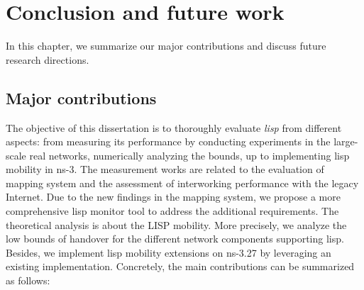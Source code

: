 
\chapter{Conclusion and future work}
\label{cha:conclusion}
In this chapter, we summarize our major contributions and discuss future research directions.

\section{Major contributions}
The objective of this dissertation is to thoroughly evaluate \emph{\acrfull{lisp}} from different aspects: from measuring its performance by conducting experiments in the large-scale real networks, numerically analyzing the bounds, up to implementing \acrshort{lisp} mobility in ns-3. The measurement works are related to the evaluation of mapping system and the assessment of interworking performance with the legacy Internet. Due to the new findings in the mapping system, we propose a more comprehensive \acrshort{lisp} monitor tool to address the additional requirements. The theoretical analysis is about the LISP mobility. More precisely, we analyze the low bounds of handover for the different network components supporting \acrshort{lisp}. Besides, we implement \acrshort{lisp} mobility extensions on ns-3.27 by leveraging an existing implementation. Concretely, the main contributions can be summarized as follows:

